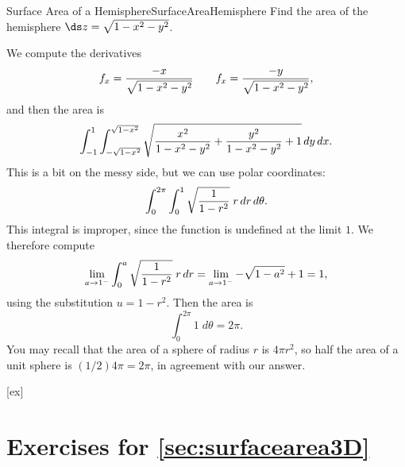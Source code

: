\begin{example}{Surface Area of a Hemisphere}{SurfaceAreaHemisphere}
Find the area of the hemisphere $\ds z=\sqrt{1-x^2-y^2}$.
\end{example}
\begin{solution}
We compute the derivatives
\[f_x={-x\over\sqrt{1-x^2-y^2}} \qquad
f_x={-y\over\sqrt{1-x^2-y^2}},\]
and then the area is
\[\int_{-1}^{1}\int_{-\sqrt{1-x^2}}^{\sqrt{1-x^2}}
\sqrt{ {x^2\over1-x^2-y^2}+{y^2\over1-x^2-y^2}+1}\,dy\,dx.\]
This is a bit on the messy side, but we can use polar coordinates:
\[\int_{0}^{2\pi}\int_{0}^{1}
\sqrt{ {1\over1-r^2}}\;r\,dr\,d\theta.\]
This integral is improper, since the function is undefined at the
limit $1$. We therefore compute
\[\lim_{a\to1^-}\int_{0}^{a}\sqrt{ {1\over1-r^2}}\;r\,dr=\lim_{a\to1^-}-\sqrt{1-a^2}+1=1,\]
using the substitution $u=1-r^2$. Then the area is 
\[\int_{0}^{2\pi}1\;d\theta=2\pi.\]
You may recall that the area of a sphere of radius $r$ is $4\pi r^2$, so half
the area of a unit sphere is $(1/2)4\pi=2\pi$, in agreement with our
answer. 
\end{solution}


[ex]
\section*{Exercises for \ref{sec:surfacearea3D}}

